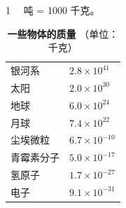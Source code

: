 \centerline{1 　吨 = 1000 千克。}

\begin{table}[H]
    \centering
    \caption*{\textbf{一些物体的质量} （单位：千克）}
    \begin{tabular}{w{l}{10em}w{r}{8em}}
        银河系      & $2.8 \times 10^{41}$ \\
        太阳        & $2.0 \times 10^{30}$ \\
        地球        & $6.0 \times 10^{24}$ \\
        月球        & $7.4 \times 10^{22}$ \\
        尘埃微粒    & $6.7 \times 10^{-10}$ \\
        青霉素分子  & $5.0 \times 10^{-17}$ \\
        氢原子      & $1.7 \times 10^{-27}$ \\
        电子        & $9.1 \times 10^{-31}$ \\
    \end{tabular}
\end{table}

